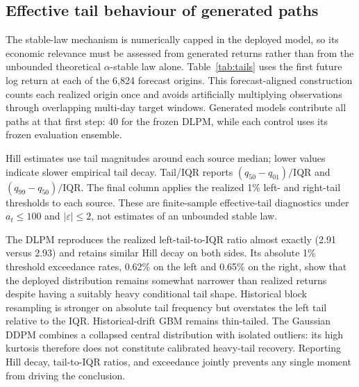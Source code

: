 ﻿\documentclass[12pt,letterpaper]{article}
\newcommand{\tabnote}[1]{\begin{minipage}{\linewidth}\vspace{4pt}\footnotesize\singlespacing #1\end{minipage}}
\begin{document}
\subsection{Effective tail behaviour of generated paths}

The stable-law mechanism is numerically capped in the deployed model, so its
economic relevance must be assessed from generated returns rather than from
the unbounded theoretical $\alpha$-stable law alone. Table~\ref{tab:tails}
uses the first future log return at each of the 6{,}824 forecast origins. This
forecast-aligned construction counts each realized origin once and avoids
artificially multiplying observations through overlapping multi-day target
windows. Generated models contribute all paths at that first step: 40 for the
frozen DLPM, while each control uses its frozen evaluation ensemble.

\begin{table}[ht]
\singlespacing
\centering
\caption{Effective one-step tail behaviour under the deployed numerical protocol}
\label{tab:tails}
\tabnote{Hill estimates use tail magnitudes around each source median; lower
values indicate slower empirical tail decay. Tail/IQR reports
$(q_{50}-q_{01})/\mathrm{IQR}$ and $(q_{99}-q_{50})/\mathrm{IQR}$. The final
column applies the realized 1\% left- and right-tail thresholds to each source.
These are finite-sample effective-tail diagnostics under $a_t\leq100$ and
$|\varepsilon|\leq2$, not estimates of an unbounded stable law.}
\end{table}

The DLPM reproduces the realized left-tail-to-IQR ratio almost exactly
(2.91 versus 2.93) and retains similar Hill decay on both sides. Its absolute
1\% threshold exceedance rates, 0.62\% on the left and 0.65\% on the right,
show that the deployed distribution remains somewhat narrower than realized
returns despite having a suitably heavy conditional tail shape. Historical
block resampling is stronger on absolute tail frequency but overstates the
left tail relative to the IQR. Historical-drift GBM remains thin-tailed. The
Gaussian DDPM combines a collapsed central distribution with isolated
outliers: its high kurtosis therefore does not constitute calibrated heavy-tail
recovery. Reporting Hill decay, tail-to-IQR ratios, and exceedance jointly
prevents any single moment from driving the conclusion.
\end{document}
